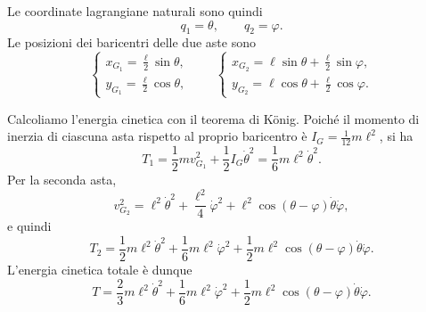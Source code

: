 \begin{example}
    Le coordinate lagrangiane naturali sono quindi
    \begin{equation*}
        q_1 = \theta, \qquad q_2 = \varphi.
    \end{equation*}
    Le posizioni dei baricentri delle due aste sono
    \begin{equation*}
        \begin{cases}
            x_{G_1} = \frac{\ell}{2}\sin\theta, \\
            y_{G_1} = \frac{\ell}{2}\cos\theta,
        \end{cases}
        \qquad
        \begin{cases}
            x_{G_2} = \ell\sin\theta + \frac{\ell}{2}\sin\varphi, \\
            y_{G_2} = \ell\cos\theta + \frac{\ell}{2}\cos\varphi.
        \end{cases}
    \end{equation*}

    Calcoliamo l'energia cinetica con il teorema di König. Poiché il momento di inerzia di ciascuna asta rispetto al proprio baricentro è $I_G = \frac{1}{12}m\ell^2$, si ha
    \begin{equation*}
        T_1 = \frac{1}{2}m v_{G_1}^2 + \frac{1}{2}I_G\dot{\theta}^2
            = \frac{1}{6}m\ell^2\dot{\theta}^2.
    \end{equation*}
    Per la seconda asta,
    \begin{equation*}
        v_{G_2}^2 = \ell^2\dot{\theta}^2 + \frac{\ell^2}{4}\dot{\varphi}^2
        + \ell^2\cos(\theta-\varphi)\dot{\theta}\dot{\varphi},
    \end{equation*}
    e quindi
    \begin{equation*}
        T_2 = \frac{1}{2}m\ell^2\dot{\theta}^2
        + \frac{1}{6}m\ell^2\dot{\varphi}^2
        + \frac{1}{2}m\ell^2\cos(\theta-\varphi)\dot{\theta}\dot{\varphi}.
    \end{equation*}
    L'energia cinetica totale è dunque
    \begin{equation*}
        T = \frac{2}{3}m\ell^2\dot{\theta}^2
        + \frac{1}{6}m\ell^2\dot{\varphi}^2
        + \frac{1}{2}m\ell^2\cos(\theta-\varphi)\dot{\theta}\dot{\varphi}.
    \end{equation*}


\end{example}

